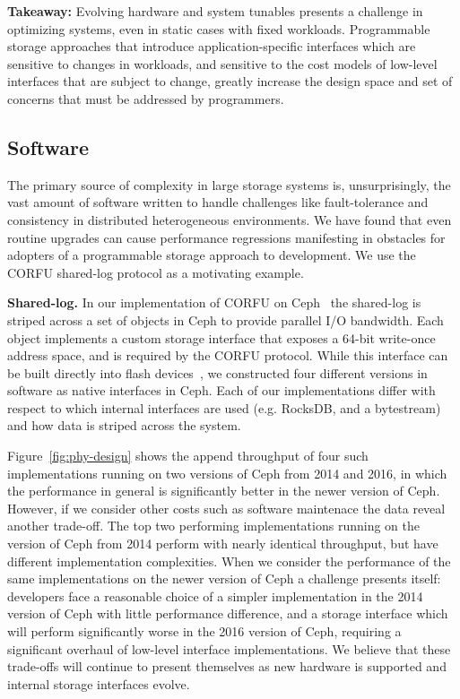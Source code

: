 \textbf{Takeaway:} Evolving hardware and system tunables presents a challenge
in optimizing systems, even in static cases with fixed workloads. Programmable
storage approaches that introduce application-specific interfaces which are
sensitive to changes in workloads, and sensitive to the cost models of
low-level interfaces that are subject to change, greatly increase the design
space and set of concerns that must be addressed by programmers.

\subsection{Software}

The primary source of complexity in large storage systems is, unsurprisingly,
the vast amount of software written to handle challenges like fault-tolerance
and consistency in distributed heterogeneous environments. We have found that
even routine upgrades can cause performance regressions manifesting in obstacles 
for adopters of a programmable storage approach to development. We use the
CORFU shared-log protocol as a motivating example.

{\bf Shared-log.} In our implementation of CORFU on Ceph~\cite{zlog} the shared-log is striped
across a set of objects in Ceph to provide parallel I/O bandwidth. Each object
implements a custom storage interface that exposes a 64-bit write-once address
space, and is required by the CORFU protocol.  While this interface can be
built directly into flash devices~\cite{wei:systor13}, we constructed four
different versions in software as native interfaces in Ceph. Each of our
implementations differ with respect to which internal interfaces are used
(e.g. RocksDB, and a bytestream) and how data is striped across the system.

Figure~\ref{fig:phy-design} shows the append throughput of four such
implementations running on two versions of Ceph from 2014 and 2016, in which
the performance in general is significantly better in the newer version of
Ceph. However, if we consider other costs such as software maintenace the data
reveal another trade-off. The top two performing implementations running on
the version of Ceph from 2014 perform with nearly identical throughput, but
have different implementation complexities. When we consider the performance
of the same implementations on the newer version of Ceph a challenge presents
itself: developers face a reasonable choice of a simpler implementation in the
2014 version of Ceph with little performance difference, and a storage
interface which will perform significantly worse in the 2016 version of Ceph,
requiring a significant overhaul of low-level interface implementations. We
believe that these trade-offs will continue to present themselves as new
hardware is supported and internal storage interfaces evolve.

